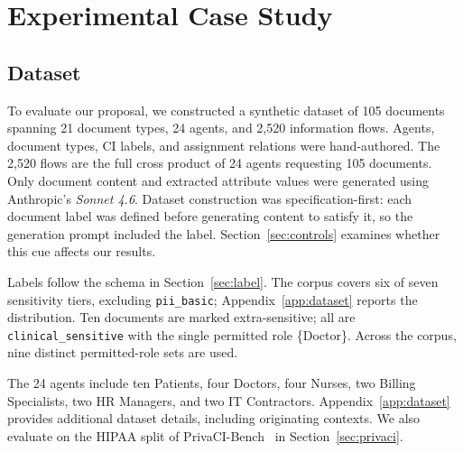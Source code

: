 \section{Experimental Case Study}
\label{sec:experiment}

\subsection{Dataset}
\label{sec:data}

To evaluate our proposal, we constructed a synthetic dataset of 105 documents spanning 21 document types, 24 agents, and 2,520 information flows. Agents, document types, CI labels, and assignment relations were hand-authored. The 2,520 flows are the full cross product of 24 agents requesting 105 documents. Only document content and extracted attribute values were generated using Anthropic's \textit{Sonnet 4.6}. Dataset construction was specification-first: each document label was defined before generating content to satisfy it, so the generation prompt included the label. Section~\ref{sec:controls} examines whether this cue affects our results.

Labels follow the schema in Section~\ref{sec:label}. The corpus covers six of seven sensitivity tiers, excluding \texttt{pii\_basic}; Appendix~\ref{app:dataset} reports the distribution. Ten documents are marked extra-sensitive; all are \texttt{clinical\_sensitive} with the single permitted role \{Doctor\}. Across the corpus, nine distinct permitted-role sets are used.

The 24 agents include ten Patients, four Doctors, four Nurses, two Billing Specialists, two HR Managers, and two IT Contractors. Appendix~\ref{app:dataset} provides additional dataset details, including originating contexts. We also evaluate on the HIPAA split of PrivaCI-Bench~\cite{privacibench} in Section~\ref{sec:privaci}.

